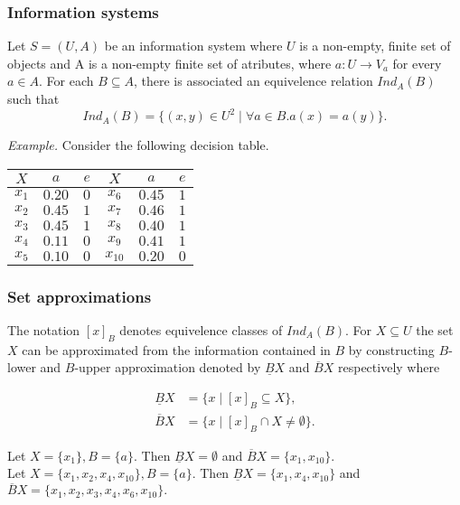 \documentclass[envcountsect]{beamer}
\begin{document}
\begin{frame}
	\frametitle{Information systems}

	Let $S=(U,A)$ be an information system where $U$ is a non-empty, finite set of objects and A is a non-empty
	finite set of atributes, where $a: U \rightarrow V_a$ for every $a \in A$. For each $B \subseteq A$, there is associated an equivelence relation $Ind_A(B)$ such that
$$	
		Ind_A(B)= \{(x,y)\in U^2 \; | \; \forall a \in B. a(x) = a(y)\}.
$$

	\emph{Example.} Consider the following decision table.

\begin{table}
	\begin{tabular}{cccccc}
		\hline 
		$X$& $a$& $e$& $X$& $a$& $e$\\
		\hline
		$x_1$ & $0.20$ & $0$&  $x_6$ & $0.45$ & $1$ \\
		$x_2$ & $0.45$ & $1$ & $x_7$ & $0.46$ & $1$ \\
		$x_3$ & $0.45$ & $1$ & $x_8$ & $0.40$ & $1$  \\
		$x_4$ & $0.11$ & $0$ & $x_9$ & $0.41$ & $1$ \\
		$x_5$ & $0.10$ & $0$ & $x_{10}$ & $0.20$ & $0$\\
		\hline
	\end{tabular}
\end{table}

\end{frame}

\begin{frame}
	\frametitle{Set approximations}
	The notation $[x]_B$ denotes equivelence classes of $Ind_A(B)$. For $X \subseteq U$ the set $X$ can be approximated from the information contained in $B$ by constructing $B$-lower and $B$-upper approximation denoted by $\underline{B}X$ and $\overline{B}X$ respectively where 

	\begin{equation*}
		\begin{split}
			\underline{B}X &= \{x \; | \; [x]_B \subseteq X \},	\\
			\overline{B}X &= \{x \; | \; [x]_B \cap X \neq \emptyset \}.
		\end{split}
	\end{equation*}
	\begin{example}
	Let $X= \{x_1\}, B=\{a\}.$ Then $\underline{B}X = \emptyset$ and $\overline{B}X = \{x_1,x_{10}\}$.\\
		Let $X=\{x_1,x_2,x_4,x_{10}\}, B=\{a\}.$ Then $\underline{B}X = \{x_1,x_4,x_{10}\}$ and $\overline{B}X = \{x_1,x_2,x_3,x_4,x_6,x_{10}\}. $ 
	\end{example}
\end{frame}
\end{document}
